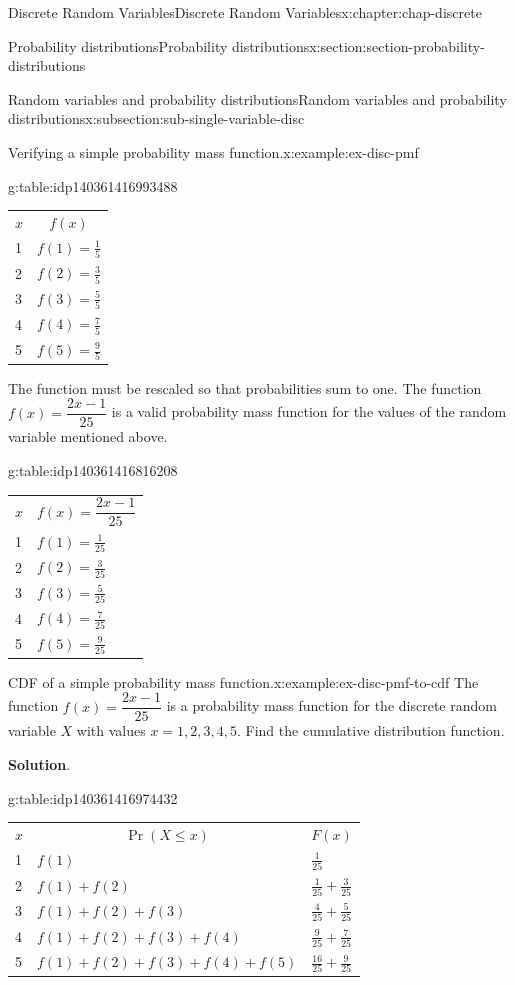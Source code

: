 \documentclass[oneside,10pt,]{book}
\newcommand{\blocktitlefont}{\relax}
\newcommand{\tabularfont}{\relax}
\numberwithin{equation}{section}
\newcommand{\hrulemedium}{\noalign{\hrule height 0.07em}}
\begin{document}
\begin{chapterptx}{Discrete Random Variables}{}{Discrete Random Variables}{}{}{x:chapter:chap-discrete}
\begin{sectionptx}{Probability distributions}{}{Probability distributions}{}{}{x:section:section-probability-distributions}
\begin{subsectionptx}{Random variables and probability distributions}{}{Random variables and probability distributions}{}{}{x:subsection:sub-single-variable-disc}
\begin{example}{Verifying a simple probability mass function.}{x:example:ex-disc-pmf}
\begin{equation*}
\end{equation*}
\begin{tableptx}{\textbf{}}{g:table:idp140361416993488}{}%
\centering
{\tabularfont%
\begin{tabular}{ll}
\multicolumn{1}{c}{\(x\)}&\multicolumn{1}{c}{\(f(x)\)}\tabularnewline\hrulemedium
1&\(f(1) = \frac{1}{5}\)\tabularnewline[0pt]
2&\(f(2) = \frac{3}{5}\)\tabularnewline[0pt]
3&\(f(3) = \frac{5}{5}\)\tabularnewline[0pt]
4&\(f(4) = \frac{7}{5}\)\tabularnewline[0pt]
5&\(f(5) = \frac{9}{5}\)
\end{tabular}
}%
\end{tableptx}%
 The function must be rescaled so that probabilities sum to one.  The function \(f(x) =
\dfrac{2x-1}{25}\) is a valid probability mass function for the values of the random variable mentioned above. \begin{tableptx}{\textbf{}}{g:table:idp140361416816208}{}%
\centering
{\tabularfont%
\begin{tabular}{ll}
\multicolumn{1}{c}{\(x\)}&\multicolumn{1}{c}{\(f(x) = \dfrac{2x-1}{25}\)}\tabularnewline\hrulemedium
1&\(f(1) = \frac{1}{25}\)\tabularnewline[0pt]
2&\(f(2) = \frac{3}{25}\)\tabularnewline[0pt]
3&\(f(3) = \frac{5}{25}\)\tabularnewline[0pt]
4&\(f(4) = \frac{7}{25}\)\tabularnewline[0pt]
5&\(f(5) = \frac{9}{25}\)
\end{tabular}
}%
\end{tableptx}%
%
\end{example}
\begin{example}{CDF of a simple probability mass function.}{x:example:ex-disc-pmf-to-cdf}%
The function \(f(x) = \dfrac{2x-1}{25}\) is a probability mass function for the discrete random variable \(X\) with values \(x=1,2,3,4,5\).  Find the cumulative distribution function.%
\par\smallskip%
\noindent\textbf{\blocktitlefont Solution}.\hypertarget{g:solution:idp140361417107632}{}\quad{}\begin{tableptx}{\textbf{}}{g:table:idp140361416974432}{}%
\centering
{\tabularfont%
\begin{tabular}{lll}
\multicolumn{1}{c}{\(x\)}&\multicolumn{1}{c}{\(\operatorname{Pr}(X \le x)\)}&\multicolumn{1}{c}{\(F(x)\)}\tabularnewline\hrulemedium
1&\(f(1) \)&\(\frac{1}{25}\)\tabularnewline[0pt]
2&\(f(1) + f(2) \)&\(\frac{1}{25} + \frac{3}{25}\)\tabularnewline[0pt]
3&\(f(1) + f(2) + f(3) \)&\(\frac{4}{25} + \frac{5}{25}\)\tabularnewline[0pt]
4&\(f(1) + f(2) + f(3) + f(4) \)&\(\frac{9}{25} + \frac{7}{25}\)\tabularnewline[0pt]
5&\(f(1) + f(2) + f(3) + f(4) + f(5) \)&\(\frac{16}{25} + \frac{9}{25}\)

\end{tabular}}
\end{tableptx}
\end{example}
\end{subsectionptx}
\end{sectionptx}
\end{chapterptx}
\end{document}
